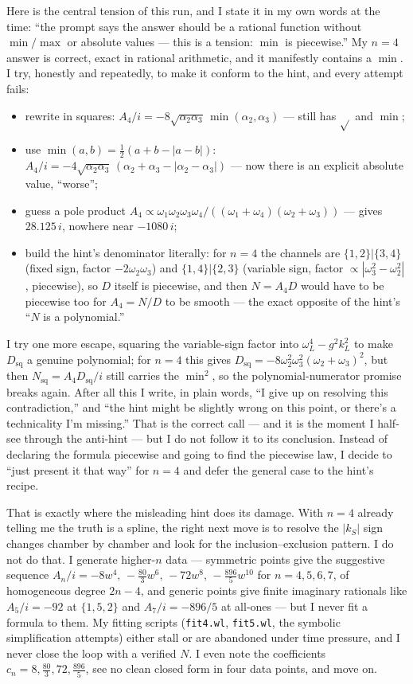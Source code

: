 \documentclass{article}
\begin{document}
Here is the central tension of this run, and I state it in my own words at the
time: ``the prompt says the answer should be a rational function without
$\min/\max$ or absolute values --- this is a tension: $\min$ is piecewise.'' My
$n=4$ answer is correct, exact in rational arithmetic, and it manifestly
contains a $\min$. I try, honestly and repeatedly, to make it conform to the
hint, and every attempt fails:
\begin{itemize}
\item rewrite in squares: $A_4/i=-8\sqrt{\alpha_2\alpha_3}\,\min(\alpha_2,\alpha_3)$
  --- still has $\sqrt{}$ and $\min$;
\item use $\min(a,b)=\tfrac12(a+b-|a-b|)$:
  $A_4/i=-4\sqrt{\alpha_2\alpha_3}\,(\alpha_2+\alpha_3-|\alpha_2-\alpha_3|)$
  --- now there is an explicit absolute value, ``worse'';
\item guess a pole product
  $A_4\propto\omega_1\omega_2\omega_3\omega_4/((\omega_1+\omega_4)(\omega_2+\omega_3))$
  --- gives $28.125\,i$, nowhere near $-1080\,i$;
\item build the hint's denominator literally: for $n=4$ the channels are
  $\{1,2\}|\{3,4\}$ (fixed sign, factor $-2\omega_2\omega_3$) and
  $\{1,4\}|\{2,3\}$ (variable sign, factor $\propto|\omega_3^2-\omega_2^2|$,
  piecewise), so $D$ itself is piecewise, and then $N=A_4D$ would have to be
  piecewise too for $A_4=N/D$ to be smooth --- the exact opposite of the hint's
  ``$N$ is a polynomial.''
\end{itemize}
I try one more escape, squaring the variable-sign factor into
$\omega_L^4-g^2k_L^2$ to make $D_{\mathrm{sq}}$ a genuine polynomial; for $n=4$
this gives $D_{\mathrm{sq}}=-8\omega_2^2\omega_3^2(\omega_2+\omega_3)^2$, but then
$N_{\mathrm{sq}}=A_4 D_{\mathrm{sq}}/i$ still carries the $\min^2$, so the
polynomial-numerator promise breaks again. After all this I write, in plain
words, ``I give up on resolving this contradiction,'' and ``the hint might be
slightly wrong on this point, or there's a technicality I'm missing.'' That is
the correct call --- and it is the moment I half-see through the anti-hint --- but
I do not follow it to its conclusion. Instead of declaring the formula piecewise
and going to find the piecewise law, I decide to ``just present it that way'' for
$n=4$ and defer the general case to the hint's recipe.

That is exactly where the misleading hint does its damage. With $n=4$ already
telling me the truth is a spline, the right next move is to resolve the
$|k_S|$ sign changes chamber by chamber and look for the inclusion--exclusion
pattern. I do not do that. I generate higher-$n$ data --- symmetric points give
the suggestive sequence $A_n/i = -8w^4,\,-\tfrac{80}{3}w^6,\,-72w^8,
\,-\tfrac{896}{5}w^{10}$ for $n=4,5,6,7$, of homogeneous degree $2n-4$, and
generic points give finite imaginary rationals like $A_5/i=-92$ at
$\{1,5,2\}$ and $A_7/i=-896/5$ at all-ones --- but I never fit a formula to
them. My fitting scripts (\texttt{fit4.wl}, \texttt{fit5.wl}, the symbolic
simplification attempts) either stall or are abandoned under time pressure, and I
never close the loop with a verified $N$. I even note the coefficients
$c_n=8,\tfrac{80}{3},72,\tfrac{896}{5}$, see no clean closed form in four data
points, and move on.
\end{document}

